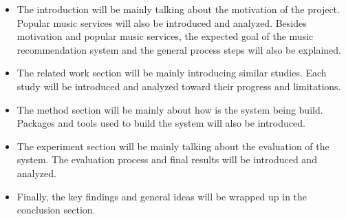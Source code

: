 \begin{itemize}
  \item The introduction will be mainly talking about the motivation of the project. Popular music services will also be introduced and analyzed. Besides motivation and popular music services, the expected goal of the music recommendation system and the general process steps will also be explained.
  \item The related work section will be mainly introducing similar studies. Each study will be introduced and analyzed toward their progress and limitations.
  \item The method section will be mainly about how is the system being build. Packages and tools used to build the system will also be introduced.
  \item The experiment section will be mainly talking about the evaluation of the system. The evaluation process and final results will be introduced and analyzed.
  \item Finally, the key findings and general ideas will be wrapped up in the conclusion section.
\end{itemize}
